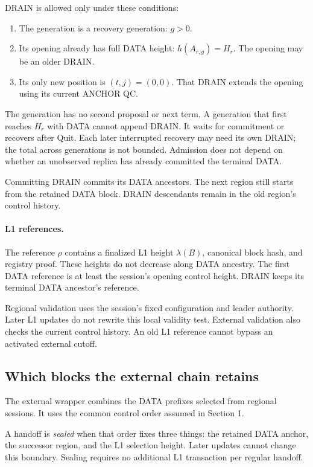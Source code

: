 \documentclass[11pt,a4paper]{article}
\begin{document}
DRAIN is allowed only under these conditions:
\begin{enumerate}[label=(\roman*)]
\item The generation is a recovery generation: $g>0$.
\item Its opening already has full DATA height: $h(A_{r,g})=H_r$.
The opening may be an older DRAIN.
\item Its only new position is $(t,j)=(0,0)$.
That DRAIN extends the opening using its current ANCHOR QC.
\end{enumerate}
The generation has no second proposal or next term.
A generation that first reaches $H_r$ with DATA cannot append DRAIN.
It waits for commitment or recovers after Quit.
Each later interrupted recovery may need its own DRAIN; the total across
generations is not bounded. Admission does not depend on whether an
unobserved replica has already committed the terminal DATA.

Committing DRAIN commits its DATA ancestors. The next region still
starts from the retained DATA block. DRAIN descendants remain in the old
region's control history.

\paragraph{L1 references.}
The reference $\rho$ contains a finalized L1 height $\lambda(B)$,
canonical block hash, and registry proof.
These heights do not decrease along DATA ancestry.
The first DATA reference is at least the session's opening control height.
DRAIN keeps its terminal DATA ancestor's reference.

Regional validation uses the session's fixed configuration and leader
authority. Later L1 updates do not rewrite this local validity test.
External validation also checks the current control history.
An old L1 reference cannot bypass an activated external cutoff.

\subsection{Which blocks the external chain retains}
\label{sec:external}
The external wrapper combines the DATA prefixes selected from regional
sessions. It uses the common control order assumed in Section 1.

A handoff is \emph{sealed} when that order fixes three things:
the retained DATA anchor, the successor region, and the L1 selection
height. Later updates cannot change this boundary.
Sealing requires no additional L1 transaction per regular handoff.
\end{document}
